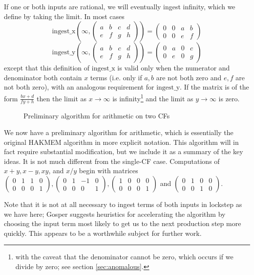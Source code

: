 \documentclass[11pt, oneside]{amsart}   	%
\newcommand{\bihomographic}[8]{\left(\begin{smallmatrix}#1&#2&#3&#4\\#5&#6&#7&#8\end{smallmatrix}\right)}
\newcommand{\abcd}{\left(
\begin{smallmatrix} 
a & b & c & d\\ 
e & f & g & h
\end{smallmatrix}
\right)}
\renewcommand{\:}{\negthickspace:\negthickspace}
\begin{document}
If one or both inputs are rational, we will eventually ingest infinity, which we define by taking the limit. In most cases
\[
\mbox{ingest\_x}(\infty, \abcd) = \bihomographic{0}{0}{a}{b} {0}{0}{e}{f}
\]
\[
\mbox{ingest\_y}(\infty, \abcd) = \bihomographic{0}{a}{0}{c}{0}{e}{0}{g}
\]
except that this definition of $\mbox{ingest\_x}$ is valid only when the numerator and denominator both contain $x$ terms
(i.e. only if $a,b$ are not both zero and $e,f$ are not both zero), with an analogous requirement for $\mbox{ingest\_y}$.
If the matrix is of the form $\frac{bx+d}{fy+h}$ then the limit as $x \to \infty$ is infinity\footnote{with the caveat that the denominator cannot be zero, which occurs if we divide by zero; see section \ref{sec:anomalous}.}
and the limit as $y \to \infty$  is zero. 


\begin{figure}\label{fig:twoCFarithPrelim}
\begin{algorithmic}
\STATE{}
 
 
\STATE{$M \gets \abcd$} 
           \ENDWHILE
\ENDWHILE
\end{algorithmic}
\caption{Preliminary algorithm for arithmetic on two CFs}
\end{figure}

We now have a preliminary algorithm for arithmetic, which is essentially the original HAKMEM algorithm in more explicit notation. 
This algorithm will in fact require substantial modification, but we include it as a summary
of the key ideas. It is not much different from the single-CF case. Computations of $x+y, x-y,xy$, and $x/y$ begin with matrices
$\bihomographic{0}{1}{1}{0}{0}{0}{0}{1}, \bihomographic{0}{1}{-1}{0}{0}{0}{0}{1},
\bihomographic{1}{0}{0}{0}{0}{0}{0}{1}$ and $\bihomographic{0}{1}{0}{0}{0}{0}{1}{0}$.

Note that it is not at all necessary to ingest terms of both inputs in lockstep as we have here;
Gosper suggests heuristics for accelerating the algorithm by choosing the input term most likely to get us to the next production step
more quickly. This appears to be a worthwhile subject for further work.
\end{document}
